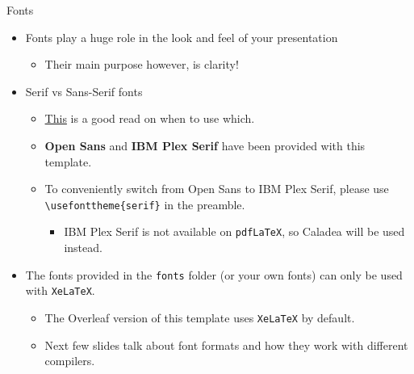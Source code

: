 \documentclass{beamer}
\newcommand{\hrefcol}[2]{\textcolor{uihteal}{\href{#1}{#2}}}
\begin{document}


\begin{frame}[fragile]{Fonts}
\begin{itemize}
\item Fonts play a huge role in the look and feel of your presentation
  \begin{itemize}
  \item Their main purpose however, is clarity!
  \end{itemize}
\item \textrm{Serif} vs \textsf{Sans-Serif} fonts
  \begin{itemize}
  \item \hrefcol{https://www.adobe.com/creativecloud/design/discover/serif-vs-sans-serif.html}{This} is a good read on when to use which.
  \item \textbf{Open Sans} and \textbf{IBM Plex Serif} have been provided with this template.
  \item To conveniently switch from Open Sans to IBM Plex Serif, please use \verb|\usefonttheme{serif}| in the preamble.
    \begin{itemize}
    \item IBM Plex Serif is not available on \verb|pdfLaTeX|, so Caladea will be used instead.
    \end{itemize}
  \end{itemize}
\item The fonts provided in the \verb|fonts| folder (or your own fonts) can only be used with \verb|XeLaTeX|.
    \begin{itemize}
    \item The Overleaf version of this template uses \verb|XeLaTeX| by default.
    \item Next few slides talk about font formats and how they work with different compilers.
    \end{itemize}
\end{itemize}
\end{frame}
\end{document}
